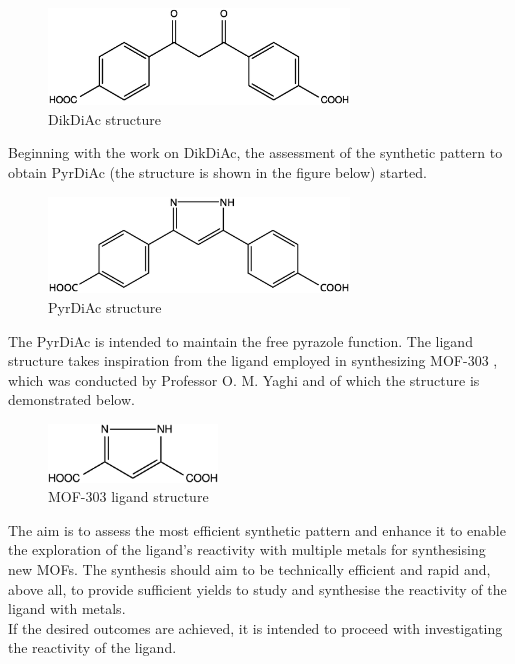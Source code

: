 \documentclass[../Master.tex]{subfiles}
\begin{document}
\begin{figure}[h!]
	\centering
	\includegraphics[width=8cm,keepaspectratio]{Structures/dikdiac.eps}
	\caption{DikDiAc structure}
\end{figure}

Beginning with the work on DikDiAc, the assessment of the synthetic pattern to obtain PyrDiAc (the structure is shown in the figure below) started.

\begin{figure}[h!]
	\centering
	\includegraphics[width=8cm,keepaspectratio]{Structures/pyr-ac2.eps}
	\caption{PyrDiAc structure}
\end{figure}

The PyrDiAc is intended to maintain the free pyrazole function. The ligand structure takes inspiration from the ligand employed in synthesizing MOF-303 \cite{cong_highly_2021}\cite{zheng_broadly_2022}, which was conducted by Professor O. M. Yaghi and of which the structure is demonstrated below.

\begin{figure}[h!]
	\centering
	\includegraphics[width=4.5cm,keepaspectratio]{Structures/ligand303.eps}
	\caption{MOF-303 ligand structure}
\end{figure}

The aim is to assess the most efficient synthetic pattern and enhance it to enable the exploration of the ligand's reactivity with multiple metals for synthesising new MOFs. The synthesis should aim to be technically efficient and rapid and, above all, to provide sufficient yields to study and synthesise the reactivity of the ligand with metals.\\
If the desired outcomes are achieved, it is intended to proceed with investigating the reactivity of the ligand.
\end{document}
